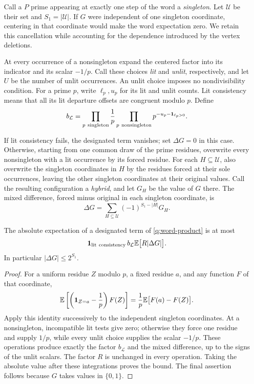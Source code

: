 Call a $P$ prime appearing at exactly one step of the word a
\emph{singleton}.  Let $\mathcal U$ be their set and $S_1=|\mathcal U|$.
If $G$ were independent of one singleton coordinate, centering in that
coordinate would make the word expectation zero.  We retain this
cancellation while accounting for the dependence introduced by the
vertex deletions.

At every occurrence
of a nonsingleton expand the centered factor into its indicator and
its scalar $-1/p$.  Call these choices \emph{lit} and \emph{unlit},
respectively, and let $U$ be the number of unlit occurrences.
An unlit choice imposes no nondivisibility condition.
For a prime $p$, write $\ell_p,u_p$ for its lit and unlit counts.
Lit consistency means that all its lit departure offsets are congruent
modulo $p$.  Define
\[
 b_{\mathcal L}=
 \prod_{p\ \mathrm{singleton}}\frac1p
 \prod_{p\ \mathrm{nonsingleton}}p^{-u_p-\mathbf 1_{\ell_p>0}}.
\]

If lit consistency fails, the designated term vanishes; set
$\Delta G=0$ in this case.  Otherwise, starting from one common draw
of the prime residues, overwrite every
nonsingleton with a lit occurrence by its forced residue.  For each
$H\subseteq\mathcal U$, also overwrite the singleton coordinates in
$H$ by the residues forced at their sole occurrences, leaving the
other singleton coordinates at their original values.  Call the
resulting configuration a \emph{hybrid}, and let $G_H$ be the value of
$G$ there.  The mixed difference, forced minus original in each
singleton coordinate, is
\[
 \Delta G=\sum_{H\subseteq\mathcal U}(-1)^{S_1-|H|}G_H.
\]

\begin{lemma}\label{q:mixed-difference}
The absolute expectation of a designated term of
\eqref{q:word-product} is at most
\begin{equation}\label{q:mixed-majorant}
 \mathbf 1_{\mathrm{lit\ consistency}}\,b_{\mathcal L}
       \mathbb E\bigl[R|\Delta G|\bigr].
\end{equation}
In particular $|\Delta G|\le2^{S_1}$.
\end{lemma}

\begin{proof}
For a uniform residue $Z$ modulo $p$, a fixed residue $a$, and any
function $F$ of that coordinate,
\[
 \mathbb E\left[\left(\mathbf 1_{Z=a}-\frac1p\right)F(Z)\right]
 =\frac1p\mathbb E\bigl[F(a)-F(Z)\bigr].
\]
Apply this identity successively to the independent singleton
coordinates.  At a nonsingleton, incompatible lit tests give zero;
otherwise they force one residue and supply $1/p$, while every unlit
choice supplies the scalar $-1/p$.  These operations produce exactly
the factor $b_{\mathcal L}$ and the mixed difference, up to the signs
of the unlit scalars.  The factor $R$ is unchanged in every operation.
Taking the absolute value after these integrations proves the bound.
The final assertion follows because $G$ takes values in $\{0,1\}$.
\end{proof}

